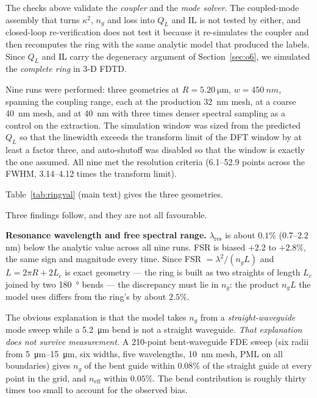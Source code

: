 \documentclass[11pt]{article}
\newcommand{\lres}{\lambda_{\mathrm{res}}}
\newcommand{\QL}{Q_L}
\begin{document}
The checks above validate the \emph{coupler} and the \emph{mode solver}. The
coupled-mode assembly that turns $\kappa^2$, $n_g$ and loss into $\QL$ and IL
is not tested by either, and closed-loop re-verification does not test it
because it re-simulates the coupler and then recomputes the ring with the same
analytic model that produced the labels. Since $\QL$ and IL carry the
degeneracy argument of Section~\ref{sec:o6}, we simulated the \emph{complete
ring} in 3-D FDTD.

Nine runs were performed: three geometries at $R = \SI{5.20}{\micro\metre}$,
$w = \SI{450}{nm}$, spanning the coupling range, each at the production
\SI{32}{nm} mesh, at a coarse \SI{40}{nm} mesh, and at \SI{40}{nm} with
three times denser spectral sampling as a control on the extraction. The
simulation window was sized from the predicted $\QL$ so that the linewidth
exceeds the transform limit of the DFT window by at least a factor three, and
auto-shutoff was disabled so that the window is exactly the one assumed. All
nine met the resolution criteria (6.1--52.9 points across the FWHM,
3.14--4.12 times the transform limit).

Table~\ref{tab:ringval} (main text) gives the three geometries.

Three findings follow, and they are not all favourable.

\textbf{Resonance wavelength and free spectral range.} $\lres$ is about $0.1\%$ ($0.7$--$2.2$\,nm) below the analytic value across all nine runs. FSR is biased $+2.2$ to $+2.8\%$, the same sign and magnitude every
time. Since FSR $= \lambda^2/(n_g L)$ and $L = 2\pi R + 2L_c$ is exact
geometry --- the ring is built as two straights of length $L_c$ joined by two
\SI{180}{\degree} bends --- the discrepancy must lie in $n_g$: the product
$n_g L$ the model uses differs from the ring's by about $2.5\%$.

The obvious explanation is that the model takes $n_g$ from a
\emph{straight-waveguide} mode sweep while a \SI{5.2}{\micro\metre} bend is
not a straight waveguide. \emph{That explanation does not survive
measurement.} A 210-point bent-waveguide FDE sweep (six radii from
\SIrange{5}{15}{\micro\metre}, six widths, five wavelengths, \SI{10}{nm}
mesh, PML on all boundaries) gives $n_g$ of the bent guide within $0.08\%$ of
the straight guide at every point in the grid, and $n_{\mathrm{eff}}$ within
$0.05\%$. The bend contribution is roughly thirty times too small to account
for the observed bias.
\end{document}
